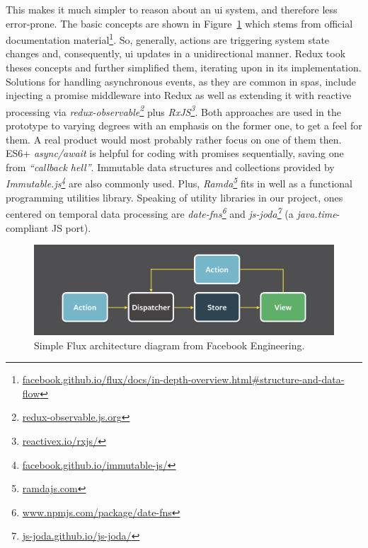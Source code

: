 This makes it much simpler to reason about an \gls{ui} system, and therefore less error-prone.
The basic concepts are shown in Figure~\ref{fig:flux-architecture} which stems from official documentation material\footnote{\textcolor{blue}{\href{https://facebook.github.io/flux/docs/in-depth-overview.html\#structure-and-data-flow}{facebook.github.io/flux/docs/in-depth-overview.html\#structure-and-data-flow}}}.
So, generally, actions are triggering system state changes and, consequently, \gls{ui} updates in a unidirectional manner.
Redux took theses concepts and further simplified them, iterating upon in its implementation.
Solutions for handling asynchronous events, as they are common in \gls{spa}s, include injecting a promise middleware into Redux as well as extending it with reactive processing via \emph{redux-observable\footnote{\textcolor{blue}{\href{https://redux-observable.js.org/}{redux-observable.js.org}}}} plus \emph{RxJS\footnote{\textcolor{blue}{\href{http://reactivex.io/rxjs/}{reactivex.io/rxjs/}}}}.
Both approaches are used in the prototype to varying degrees with an emphasis on the former one, to get a feel for them.
A real product would most probably rather focus on one of them then.
ES6+ \emph{async/await} is helpful for coding with promises sequentially, saving one from \emph{``callback hell''}.
Immutable data structures and collections provided by \emph{Immutable.js\footnote{\textcolor{blue}{\href{https://facebook.github.io/immutable-js/}{facebook.github.io/immutable-js/}}}} are also commonly used.
Plus, \emph{Ramda\footnote{\textcolor{blue}{\href{http://ramdajs.com/}{ramdajs.com}}}} fits in well as a functional programming utilities library.
Speaking of utility libraries in our project, ones centered on temporal data processing are \emph{date-fns\footnote{\textcolor{blue}{\href{https://www.npmjs.com/package/date-fns}{www.npmjs.com/package/date-fns}}}} and \emph{js-joda\footnote{\textcolor{blue}{\href{https://js-joda.github.io/js-joda/}{js-joda.github.io/js-joda/}}}} (a \emph{java.time}-compliant \textsc{JS} port).

\begin{figure}[h]
  \centering
  \includegraphics[width=1.0\textwidth]{figures/architecture/flux-simple}
  \caption{Simple Flux architecture diagram from Facebook Engineering.}
  \label{fig:flux-architecture}
\end{figure}

